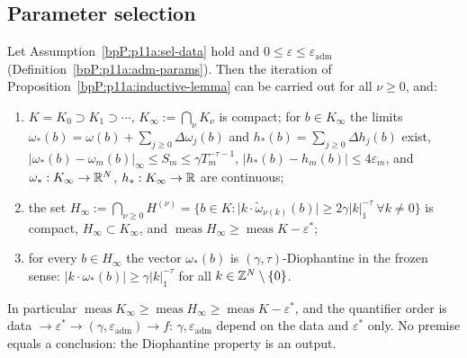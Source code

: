 \subsection{Parameter selection}\label{bpP:p11a:sec-select}

\begin{theorem}\label{bpP:p11a:parameter-selection}
Let Assumption~\ref{bpP:p11a:sel-data} hold and $0\le\varepsilon\le\varepsilon_{\mathrm{adm}}$ (Definition~\ref{bpP:p11a:adm-params}). Then the iteration of Proposition~\ref{bpP:p11a:inductive-lemma} can be carried out for all $\nu\ge0$, and:
\begin{enumerate}[label=(\alph*)]
\item $K=K_0\supset K_1\supset\cdots$, $K_\infty:=\bigcap_\nu K_\nu$ is compact; for $b\in K_\infty$ the limits $\omega_*(b)=\omega(b)+\sum_{j\ge0}\Delta\omega_j(b)$ and $h_*(b)=\sum_{j\ge0}\Delta h_j(b)$ exist, $\lvert\omega_*(b)-\omega_m(b)\rvert_\infty\le S_m\le\gamma T_m^{-\tau-1}$, $\lvert h_*(b)-h_m(b)\rvert\le4\varepsilon_m$, and $\omega_*:K_\infty\to\mathbb{R}^N$, $h_*:K_\infty\to\mathbb{R}$ are continuous;
\item the set $H_\infty:=\bigcap_{\nu\ge0}H^{(\nu)}=\{b\in K:\lvert k\cdot\tilde\omega_{\nu(k)}(b)\rvert\ge2\gamma\lvert k\rvert_1^{-\tau}\ \forall k\ne0\}$ is compact, $H_\infty\subset K_\infty$, and $\operatorname{meas}H_\infty\ge\operatorname{meas}K-\varepsilon^*$;
\item for every $b\in H_\infty$ the vector $\omega_*(b)$ is $(\gamma,\tau)$-Diophantine in the frozen sense: $\lvert k\cdot\omega_*(b)\rvert\ge\gamma\lvert k\rvert_1^{-\tau}$ for all $k\in\mathbb{Z}^N\setminus\{0\}$.
\end{enumerate}
In particular $\operatorname{meas}K_\infty\ge\operatorname{meas}H_\infty\ge\operatorname{meas}K-\varepsilon^*$, and the quantifier order is data $\to\varepsilon^*\to(\gamma,\varepsilon_{\mathrm{adm}})\to f$: $\gamma,\varepsilon_{\mathrm{adm}}$ depend on the data and $\varepsilon^*$ only. No premise equals a conclusion: the Diophantine property is an output.
\end{theorem}
